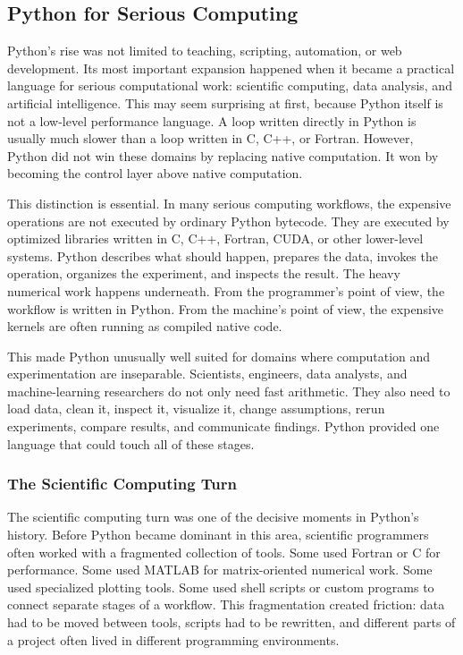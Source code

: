 \subsection{Python for Serious Computing}

Python's rise was not limited to teaching, scripting, automation, or web development. Its most important expansion happened when it became a practical language for serious computational work: scientific computing, data analysis, and artificial intelligence. This may seem surprising at first, because Python itself is not a low-level performance language. A loop written directly in Python is usually much slower than a loop written in C, C++, or Fortran. However, Python did not win these domains by replacing native computation. It won by becoming the control layer above native computation.

This distinction is essential. In many serious computing workflows, the expensive operations are not executed by ordinary Python bytecode. They are executed by optimized libraries written in C, C++, Fortran, CUDA, or other lower-level systems. Python describes what should happen, prepares the data, invokes the operation, organizes the experiment, and inspects the result. The heavy numerical work happens underneath. From the programmer's point of view, the workflow is written in Python. From the machine's point of view, the expensive kernels are often running as compiled native code.

This made Python unusually well suited for domains where computation and experimentation are inseparable. Scientists, engineers, data analysts, and machine-learning researchers do not only need fast arithmetic. They also need to load data, clean it, inspect it, visualize it, change assumptions, rerun experiments, compare results, and communicate findings. Python provided one language that could touch all of these stages.

\subsubsection{The Scientific Computing Turn}

The scientific computing turn was one of the decisive moments in Python's history. Before Python became dominant in this area, scientific programmers often worked with a fragmented collection of tools. Some used Fortran or C for performance. Some used MATLAB for matrix-oriented numerical work. Some used specialized plotting tools. Some used shell scripts or custom programs to connect separate stages of a workflow. This fragmentation created friction: data had to be moved between tools, scripts had to be rewritten, and different parts of a project often lived in different programming environments.

